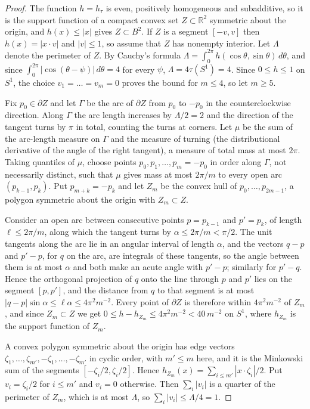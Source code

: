 \documentclass[11pt]{amsart}
\theoremstyle{definition}
\theoremstyle{remark}
\numberwithin{equation}{section}
\newcommand{\RR}{\mathbb{R}}
\begin{document}
\begin{proof}
The function $h=h_\tau$ is even, positively homogeneous and subadditive, so it is the support function of a compact convex set $Z\subset\RR^2$ symmetric about the origin, and $h(x)\le|x|$ gives $Z\subset B^2$. If $Z$ is a segment $[-v,v]$ then $h(x)=|x\cdot v|$ and $|v|\le1$, so assume that $Z$ has nonempty interior. Let $\Lambda$ denote the perimeter of $Z$. By Cauchy's formula $\Lambda=\int_0^{2\pi}h(\cos\theta,\sin\theta)\,d\theta$, and since $\int_0^{2\pi}|\cos(\theta-\psi)|\,d\theta=4$ for every $\psi$, $\Lambda=4\tau(S^1)=4$. Since $0\le h\le1$ on $S^1$, the choice $v_1=\dots=v_m=0$ proves the bound for $m\le4$, so let $m\ge5$.

Fix $p_0\in\partial Z$ and let $\Gamma$ be the arc of $\partial Z$ from $p_0$ to $-p_0$ in the counterclockwise direction. Along $\Gamma$ the arc length increases by $\Lambda/2=2$ and the direction of the tangent turns by $\pi$ in total, counting the turns at corners. Let $\mu$ be the sum of the arc-length measure on $\Gamma$ and the measure of turning (the distributional derivative of the angle of the right tangent), a measure of total mass at most $2\pi$. Taking quantiles of $\mu$, choose points $p_0,p_1,\dots,p_m=-p_0$ in order along $\Gamma$, not necessarily distinct, such that $\mu$ gives mass at most $2\pi/m$ to every open arc $(p_{k-1},p_k)$. Put $p_{m+k}=-p_k$ and let $Z_m$ be the convex hull of $p_0,\dots,p_{2m-1}$, a polygon symmetric about the origin with $Z_m\subset Z$.

Consider an open arc between consecutive points $p=p_{k-1}$ and $p'=p_k$, of length $\ell\le2\pi/m$, along which the tangent turns by $\alpha\le2\pi/m<\pi/2$. The unit tangents along the arc lie in an angular interval of length $\alpha$, and the vectors $q-p$ and $p'-p$, for $q$ on the arc, are integrals of these tangents, so the angle between them is at most $\alpha$ and both make an acute angle with $p'-p$; similarly for $p'-q$. Hence the orthogonal projection of $q$ onto the line through $p$ and $p'$ lies on the segment $[p,p']$, and the distance from $q$ to that segment is at most $|q-p|\sin\alpha\le\ell\alpha\le4\pi^2m^{-2}$. Every point of $\partial Z$ is therefore within $4\pi^2m^{-2}$ of $Z_m$, and since $Z_m\subset Z$ we get $0\le h-h_{Z_m}\le4\pi^2m^{-2}<40\,m^{-2}$ on $S^1$, where $h_{Z_m}$ is the support function of $Z_m$.

A convex polygon symmetric about the origin has edge vectors $\zeta_1,\dots,\zeta_{m'},-\zeta_1,\dots,-\zeta_{m'}$ in cyclic order, with $m'\le m$ here, and it is the Minkowski sum of the segments $[-\zeta_i/2,\zeta_i/2]$. Hence $h_{Z_m}(x)=\sum_{i\le m'}|x\cdot\zeta_i|/2$. Put $v_i=\zeta_i/2$ for $i\le m'$ and $v_i=0$ otherwise. Then $\sum_i|v_i|$ is a quarter of the perimeter of $Z_m$, which is at most $\Lambda$, so $\sum_i|v_i|\le\Lambda/4=1$.
\end{proof}
\end{document}

